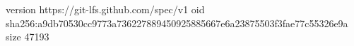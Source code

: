 version https://git-lfs.github.com/spec/v1
oid sha256:a9db70530cc9773a736227889450925885667e6a23875503f3fae77c55326e9a
size 47193
